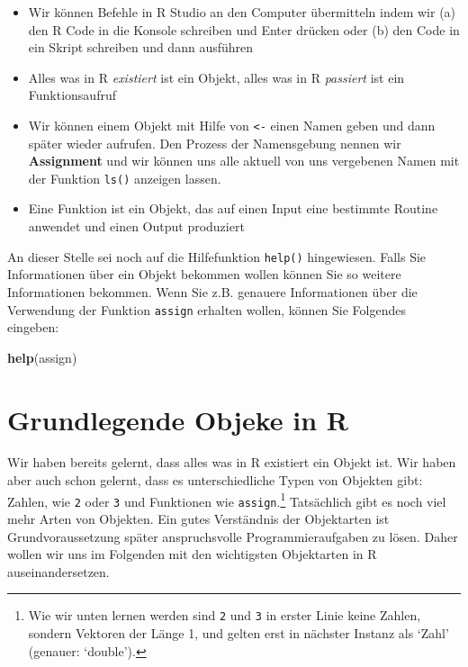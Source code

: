 \documentclass[]{tufte-book}
\newenvironment{Shaded}{}{}
\newcommand{\KeywordTok}[1]{\textcolor[rgb]{0.00,0.44,0.13}{\textbf{#1}}}
\newcommand{\NormalTok}[1]{#1}
\providecommand{\tightlist}{%
  \setlength{\itemsep}{0pt}\setlength{\parskip}{0pt}}
\begin{document}
\begin{itemize}
\tightlist
\item
  Wir können Befehle in R Studio an den Computer übermitteln indem wir
  (a) den R Code in die Konsole schreiben und Enter drücken oder (b) den
  Code in ein Skript schreiben und dann ausführen
\item
  Alles was in R \emph{existiert} ist ein Objekt, alles was in R
  \emph{passiert} ist ein Funktionsaufruf
\item
  Wir können einem Objekt mit Hilfe von \texttt{\textless{}-} einen
  Namen geben und dann später wieder aufrufen. Den Prozess der
  Namensgebung nennen wir \textbf{Assignment} und wir können uns alle
  aktuell von uns vergebenen Namen mit der Funktion \texttt{ls()}
  anzeigen lassen.
\item
  Eine Funktion ist ein Objekt, das auf einen Input eine bestimmte
  Routine anwendet und einen Output produziert
\end{itemize}

An dieser Stelle sei noch auf die Hilfefunktion \texttt{help()}
hingewiesen. Falls Sie Informationen über ein Objekt bekommen wollen
können Sie so weitere Informationen bekommen. Wenn Sie z.B. genauere
Informationen über die Verwendung der Funktion \texttt{assign} erhalten
wollen, können Sie Folgendes eingeben:

\begin{Shaded}
\begin{Highlighting}[]
\KeywordTok{help}\NormalTok{(assign)}
\end{Highlighting}
\end{Shaded}

\section{Grundlegende Objeke in R}\label{grundlegende-objeke-in-r}

Wir haben bereits gelernt, dass alles was in R existiert ein Objekt ist.
Wir haben aber auch schon gelernt, dass es unterschiedliche Typen von
Objekten gibt: Zahlen, wie \texttt{2} oder \texttt{3} und Funktionen wie
\texttt{assign}.\footnote{Wie wir unten lernen werden sind \texttt{2}
  und \texttt{3} in erster Linie keine Zahlen, sondern Vektoren der
  Länge 1, und gelten erst in nächster Instanz als `Zahl' (genauer:
  `double').} Tatsächlich gibt es noch viel mehr Arten von Objekten. Ein
gutes Verständnis der Objektarten ist Grundvoraussetzung später
anspruchsvolle Programmieraufgaben zu lösen. Daher wollen wir uns im
Folgenden mit den wichtigsten Objektarten in R auseinandersetzen.
\end{document}

